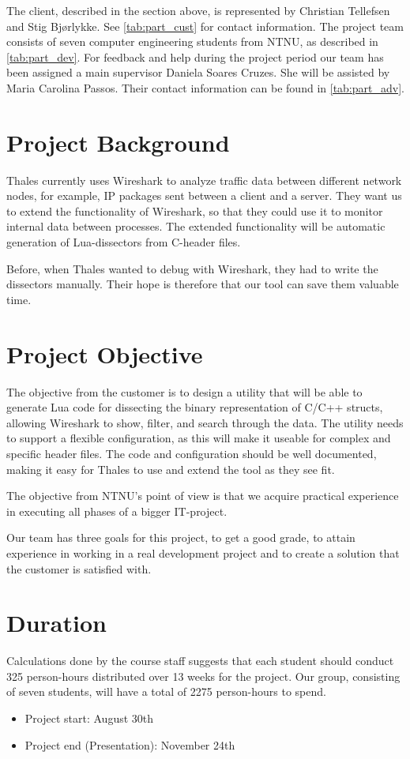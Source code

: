 The client, described in the section above, is represented by Christian Tellefsen and Stig Bjørlykke. See \ref{tab:part_cust} for contact information.
The project team consists of seven computer engineering students from NTNU, as described in \ref{tab:part_dev}.
For feedback and help during the project period our team has been assigned a main supervisor Daniela Soares Cruzes.
She will be assisted by Maria Carolina Passos. Their contact information can be found in \ref{tab:part_adv}.

\section{Project Background}
Thales currently uses Wireshark to analyze traffic data between different network nodes, for example, IP packages sent between a client and a server.
They want us to extend the functionality of Wireshark, so that they could use it to monitor internal data between processes. The extended functionality will be automatic generation of Lua-dissectors from C-header files.

Before, when Thales wanted to debug with Wireshark, they had to write the dissectors manually. Their hope is therefore that our tool can save them valuable time.

\section{Project Objective}
The objective from the customer is to design a utility that will be able to generate Lua code for dissecting the binary representation of C/C++ structs, allowing Wireshark to show, filter, and search through the data. The utility needs to support a flexible configuration, as this will make it useable for complex and specific header files. 
The code and configuration should be well documented, making it easy for Thales to use and extend the tool as they see fit.

The objective from NTNU's point of view is that we acquire practical experience in executing all phases of a bigger IT-project.

Our team has three goals for this project, to get a good grade, to attain experience in working in a real development project and to create a solution that the customer
is satisfied with.

\section{Duration}
Calculations done by the course staff suggests that each student should conduct 325 person-hours distributed over 13 weeks for the project. Our group, consisting of seven students, will have a total of 2275 person-hours to spend.\\
\begin {itemize}
	\item Project start: August 30th
	\item Project end (Presentation): November 24th
\end{itemize}


